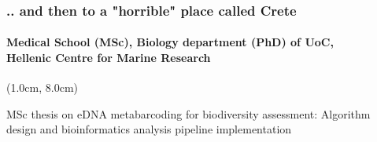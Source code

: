 \documentclass{beamer}
\begin{document}
   \begin{frame}

      \frametitle{.. and then to a "horrible" place called Crete}
      \framesubtitle{
         Medical School (MSc), Biology department (PhD) of UoC, \\
         Hellenic Centre for Marine Research
         }


      \begin{textblock*}{10cm}(1.0cm, 8.0cm)

         \small MSc thesis on eDNA metabarcoding for biodiversity assessment: 
         Algorithm design and bioinformatics analysis pipeline implementation
         
      \end{textblock*}


   \end{frame}
   \fi


\end{document}
